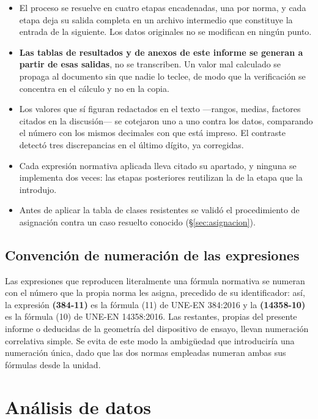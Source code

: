 \documentclass[11pt,a4paper]{article}
\begin{document}
\begin{itemize}
  \item El proceso se resuelve en cuatro etapas encadenadas, una por norma, y cada
        etapa deja su salida completa en un archivo intermedio que constituye la
        entrada de la siguiente. Los datos originales no se modifican en ningún punto.
  \item \textbf{Las tablas de resultados y de anexos de este informe se generan a
        partir de esas salidas}, no se transcriben. Un valor mal calculado se propaga
        al documento sin que nadie lo teclee, de modo que la verificación se concentra
        en el cálculo y no en la copia.
  \item Los valores que sí figuran redactados en el texto ---rangos, medias, factores
        citados en la discusión--- se cotejaron uno a uno contra los datos, comparando
        el número con los mismos decimales con que está impreso. El contraste detectó
        tres discrepancias en el último dígito, ya corregidas.
  \item Cada expresión normativa aplicada lleva citado su apartado, y ninguna se
        implementa dos veces: las etapas posteriores reutilizan la de la etapa que la
        introdujo.
  \item Antes de aplicar la tabla de clases resistentes se validó el procedimiento de
        asignación contra un caso resuelto conocido (\S\ref{sec:asignacion}).
\end{itemize}

\subsection{Convención de numeración de las expresiones}

Las expresiones que reproducen literalmente una fórmula normativa se numeran con el
número que la propia norma les asigna, precedido de su identificador: así, la expresión
\textbf{(384-11)} es la fórmula (11) de UNE-EN 384:2016 y la \textbf{(14358-10)} es la
fórmula (10) de UNE-EN 14358:2016. Las restantes, propias del presente informe o
deducidas de la geometría del dispositivo de ensayo, llevan numeración correlativa
simple. Se evita de este modo la ambigüedad que introduciría una numeración única, dado
que las dos normas empleadas numeran ambas sus fórmulas desde la unidad.

\section{Análisis de datos}
\end{document}
